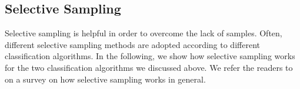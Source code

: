 



\subsection{Selective Sampling} \label{subsec:active:learning}
Selective sampling is helpful in order to overcome the lack of samples. Often, different selective sampling methods are adopted according to different classification algorithms. In the following, we show how selective sampling works for the two classification algorithms we discussed above. We refer the readers to~\cite{???} on a survey on how selective sampling works in general. 


